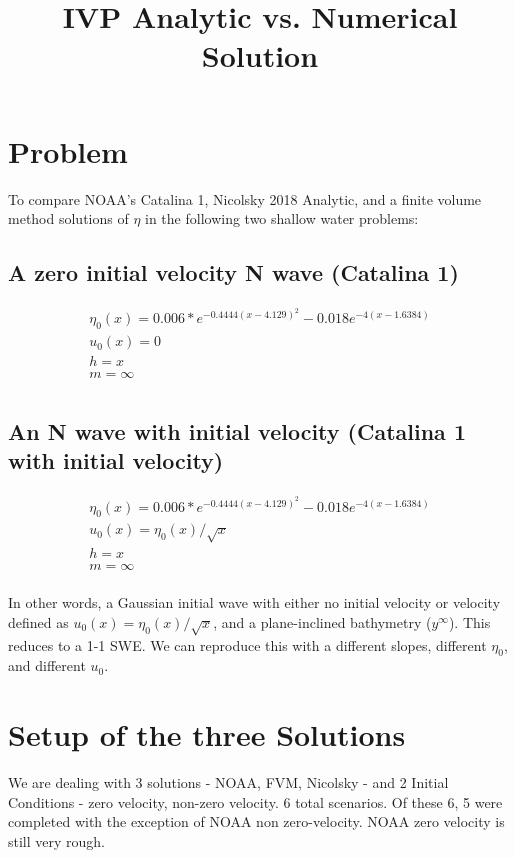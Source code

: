 \documentclass{article}
\title{ IVP Analytic vs. Numerical Solution }
\begin{document}
\maketitle

\section{Problem}

To compare NOAA's Catalina 1, Nicolsky 2018 Analytic, and a finite volume method solutions of $\eta$ in the following two shallow water problems:

\subsection {A zero initial velocity N wave (Catalina 1)}

\[
\begin{aligned}
\eta_0(x) = 0.006*e^{-0.4444(x-4.129)^2} - 0.018e^{-4(x-1.6384)} \\
u_0(x) = 0 \\
h = x \\
m = \infty  \\
\end{aligned}
\]

\subsection{An N wave with initial velocity (Catalina 1 with initial velocity)}

\[
\begin{aligned}
\eta_0(x) = 0.006*e^{-0.4444(x-4.129)^2} - 0.018e^{-4(x-1.6384)} \\
u_0(x) = \eta_0(x)/\sqrt{x} \\
h = x \\
m = \infty  \\
\end{aligned}
\]

In other words, a Gaussian initial wave with either no initial velocity or velocity defined as $u_0(x) = \eta_0(x)/\sqrt{x}$, and a plane-inclined bathymetry ($y^\infty$). This reduces to a 1-1 SWE. We can reproduce this with a different slopes, different $\eta_0$, and different $u_0$.

\section{Setup of the three Solutions}

We are dealing with 3 solutions - NOAA, FVM, Nicolsky - and 2 Initial Conditions - zero velocity, non-zero velocity. 6 total scenarios. Of these 6, 5 were completed with the exception of NOAA non zero-velocity. NOAA zero velocity is still very rough.
\end{document}
